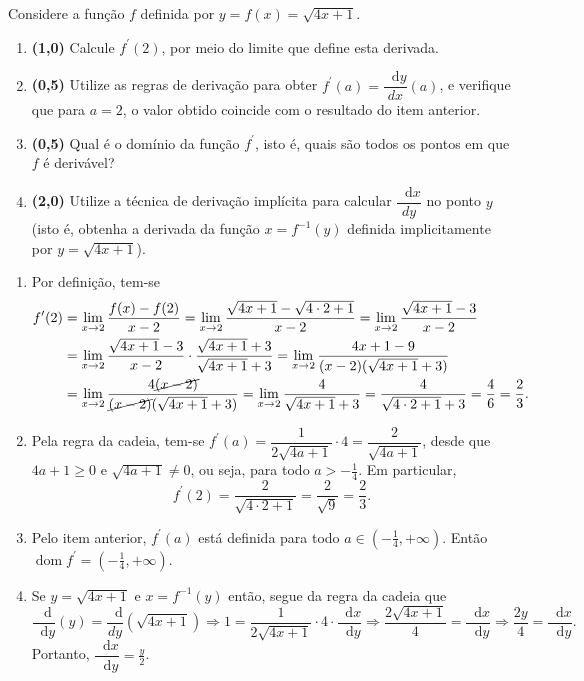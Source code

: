 \documentclass[12pt,a4paper]{article}
\newcommand*\diff{\mathop{}\!\mathrm{d}}
\begin{document}
\begin{ExerciseList}
\Exercise%
Considere a função $f$ definida por $y = f(x) = \sqrt{4x + 1}$.
\begin{enumerate}
\item \textbf{(1,0)} Calcule $f^\prime(2)$, por meio do limite que define esta derivada.
\item \textbf{(0,5)} Utilize as regras de derivação para obter $f^\prime(a) = \dfrac{ \diff{y} } { {dx} } (a)$, e verifique que para $a = 2$, o valor obtido coincide com o resultado do item anterior.
\item \textbf{(0,5)} Qual é o domínio da função $f^\prime$, isto é, quais são todos os pontos em que $f$ é derivável?
\item \textbf{(2,0)} Utilize a técnica de derivação implícita para calcular $\dfrac{ \diff{x} } { {dy} }$ no ponto $y$ (isto é, obtenha a derivada da função $x=f^{-1}(y)$ definida implicitamente por $y = \sqrt{4x + 1}$).
\end{enumerate}

\Answer
\begin{enumerate}
\item Por definição, tem-se
\begin{align*}
f^\prime(2) & = \lim_{x \to 2} \frac{f(x)-f(2)}{x-2}
   = \lim_{x \to 2} \frac{\sqrt{4x + 1}-\sqrt{4\cdot 2 + 1}}{x-2}
   = \lim_{x \to 2} \frac{\sqrt{4x + 1}-3}{x-2} \\
 & = \lim_{x \to 2} \frac{\sqrt{4x + 1}-3}{x-2} \cdot
                    \frac{\sqrt{4x + 1}+3}{\sqrt{4x + 1}+3}
   = \lim_{x \to 2} \frac{4x + 1 - 9}{(x-2)(\sqrt{4x + 1}+3)} \\
 & = \lim_{x \to 2} \frac{4\cancel{(x - 2)}}{\cancel{(x-2)}(\sqrt{4x + 1}+3)}
   = \lim_{x \to 2} \frac{4}{\sqrt{4x + 1}+3}
   = \frac{4}{\sqrt{4 \cdot 2 + 1}+3}
   = \frac{4}{6}
   = \frac{2}{3}.
\end{align*}

\item Pela regra da cadeia, tem-se
$f^\prime(a) = \dfrac{1}{2\sqrt{4a+1}} \cdot 4 = \dfrac{2}{\sqrt{4a+1}}$, desde que $4a+1 \geq 0$ e $\sqrt{4a+1} \neq 0$, ou seja, para todo $a > -\frac{1}{4}$. Em particular,
\[
f^\prime(2)
= \frac{2}{\sqrt{4\cdot 2+1}}
= \frac{2}{\sqrt{9}}
= \frac{2}{3}.
\]

\item Pelo item anterior, $f^\prime(a)$ está definida para todo $a \in (-\frac{1}{4}, +\infty)$. Então $\operatorname{dom}{f^\prime} = (-\frac{1}{4}, +\infty)$.
\item Se $y = \sqrt{4x + 1}$ e $x=f^{-1}(y)$ então, segue da regra da cadeia que
\[
\dfrac{ \diff } { \diff{y} }(y)
= \dfrac{ \diff } { {dy} } \left(\sqrt{4x + 1}\right)
\Rightarrow
1
= \frac{1}{2\sqrt{4x + 1}}\cdot 4 \cdot  \dfrac{ \diff{x} } { \diff{y} }
\Rightarrow
\frac{2\sqrt{4x + 1}}{4}
= \dfrac{ \diff{x} } { \diff{y} }
\Rightarrow
\frac{2y}{4}
= \dfrac{ \diff{x} } { \diff{y} }.
\]
Portanto, $\dfrac{ \diff{x} } { \diff{y} } = \frac{y}{2}$.
\end{enumerate}


\end{ExerciseList}
\end{document}
